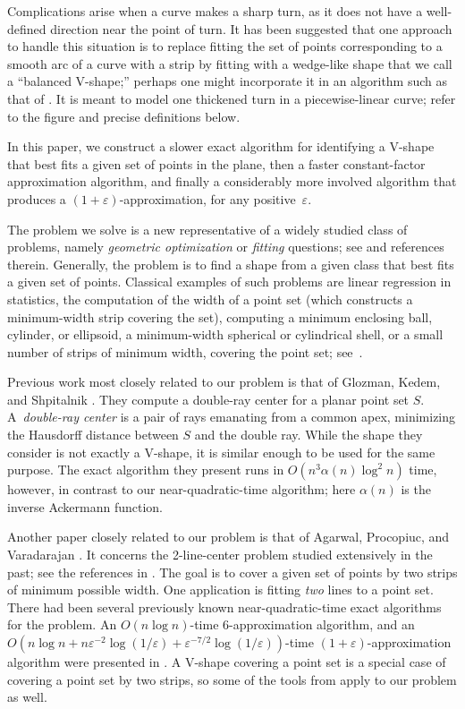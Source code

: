 \documentclass{llncs}
\let\eps\varepsilon
\begin{document}
Complications arise when a curve makes a sharp turn, as it does not
have a well-defined direction near the point of turn.  It has been
suggested \cite{curve-noisy,proj-clustering} that one approach to handle this situation
is to replace fitting the set of points corresponding to a smooth arc of a
curve with a strip by fitting with a wedge-like shape that we call a ``balanced
V-shape;'' perhaps one might incorporate it in an algorithm such as
that of
\cite{Funke-Ramos}.  It is meant to model one thickened turn in a 
piecewise-linear curve; refer to the figure and precise
definitions below.

In this paper, we construct a slower exact algorithm for identifying a V-shape that best
fits a given set of points in the plane, then a
faster constant-factor approximation algorithm, and finally a
considerably more involved algorithm that produces a
$(1+\eps)$-approximation, for any positive~$\eps$.

The problem we solve is a new representative of a widely studied class
of problems, namely \emph{geometric optimization} or \emph{fitting}
questions; see
\cite{coreset-survey,random-opt-survey,alg-opt-survey,eff-alg-opt-survey}
and references therein.  Generally, the problem is to find a shape
from a given class that best fits a given set of points.  Classical
examples of such problems are linear regression in statistics, the
computation of the width of a point set (which constructs a
minimum-width strip covering the set), computing a minimum enclosing
ball, cylinder, or ellipsoid, a minimum-width spherical or
cylindrical shell, or a small number of strips of minimum width,
covering the point set; see~\cite{chan-apx-all,coreset-survey}.

Previous work most closely related to our problem is that of Glozman,
Kedem, and Shpitalnik \cite{GKS}.  They compute a double-ray center
for a planar point set $S$.  A~\emph{double-ray center} is a pair of
rays emanating from a common apex, minimizing the Hausdorff distance
between $S$ and the double ray.  While the shape they consider is not
exactly a V-shape, it is similar enough to be used for the same
purpose.  The exact algorithm they present runs in $O(n^3 \alpha (n)
\log^2 n)$ time, however, in contrast to our near-quadratic-time
algorithm; here $\alpha(n)$ is the inverse Ackermann function.

Another paper closely related to our problem is that of Agarwal,
Procopiuc, and Varadarajan \cite{2-line-center}.
It concerns the
2-line-center problem studied extensively in the past; see the
references in \cite{2-line-center}.  The goal is to cover a given set
of points by two strips of minimum possible width.  One
application is fitting \emph{two} lines to a point set.  There had
been several previously known near-quadratic-time exact algorithms for
the problem.  An $O(n\log n)$-time 6-approximation algorithm, and an
$O(n \log n + n\eps^{-2}\log(1/\eps)+ \eps^{-7/2} \log(1/\eps))$-time
$(1+\eps)$-approximation algorithm were presented in
\cite{2-line-center}.  A V-shape covering a point set is a special
case of covering a point set by two strips, so some of the
tools from \cite{2-line-center} apply to our problem as well.
\end{document}
